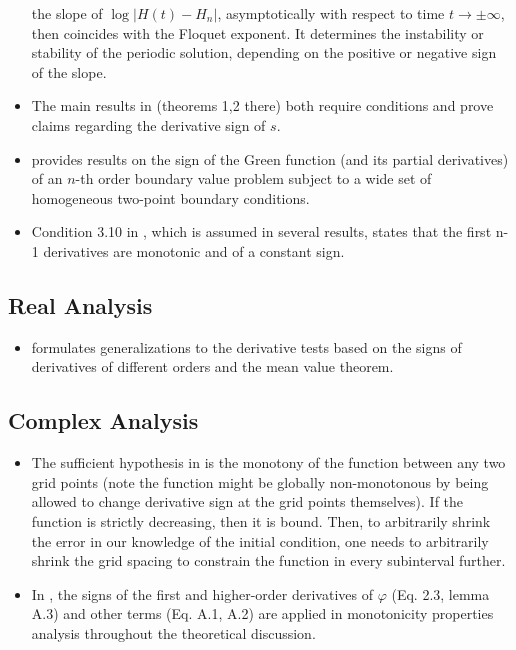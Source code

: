 \documentclass[11pt]{book}
\begin{document}
\begin{itemize}
the slope of $\log\left|H\left(t\right)-H_{n}\right|$, asymptotically
with respect to time $t\rightarrow\pm\infty$, then coincides with
the Floquet exponent. It determines the instability or stability of
the periodic solution, depending on the positive or negative sign
of the slope.
\item The main results in \cite{turaev2020florin}
(theorems 1,2 there) both require conditions and prove claims regarding
the derivative sign of $s$.
\item \cite{almenar2020sign}
provides results on the sign of the Green function (and its partial
derivatives) of an $n$-th order boundary value problem subject to
a wide set of homogeneous two-point boundary conditions.
\item Condition 3.10 in \cite{panda2020oscillatory},
which is assumed in several results, states that the first n-1 derivatives
are monotonic and of a constant sign.
\end{itemize}

\subsection{Real Analysis}
\begin{itemize}
\item \cite{gkioulekas2014generalized}
formulates generalizations to the derivative tests based on the signs
of derivatives of different orders and the mean value theorem.
\end{itemize}

\subsection{Complex Analysis}
\begin{itemize}
\item The sufficient hypothesis in \cite{gimeno2008euclidean}
is the monotony of the function between any two grid points (note
the function might be globally non-monotonous by being allowed to
change derivative sign at the grid points themselves). If the function
is strictly decreasing, then it is bound. Then, to arbitrarily shrink
the error in our knowledge of the initial condition, one needs to
arbitrarily shrink the grid spacing to constrain the function in every
subinterval further.
\item In \cite{berdellima2019note}, the signs of
the first and higher-order derivatives of $\varphi$ (Eq. 2.3, lemma
A.3) and other terms (Eq. A.1, A.2) are applied in monotonicity properties
analysis throughout the theoretical discussion.
\end{itemize}
\end{document}
